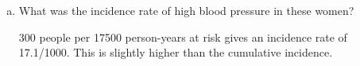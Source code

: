 \begin{enumerate}[(a)]
\item What was the incidence rate of high blood pressure in these
  women?
\answerSpace{.6in}
\begin{AnswerText}
300 people per 17500 person-years at risk gives an incidence rate of
17.1/1000.  This is slightly higher than the cumulative incidence.
\end{AnswerText}


\end{enumerate}

